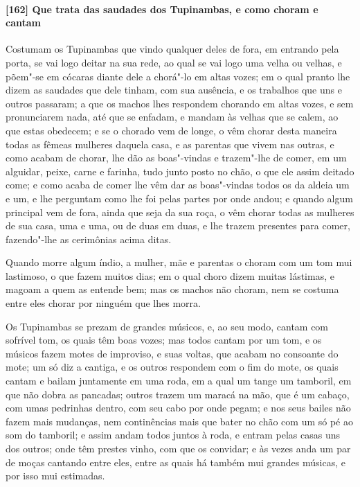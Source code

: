 \paragraph{[162] Que trata das saudades dos Tupinambas, e como choram e cantam}\quad
Costumam os Tupinambas que vindo qualquer deles de fora, em entrando pela porta, se vai
logo deitar na sua rede, ao qual se vai logo uma velha ou velhas, e põem"-se em cócaras
diante dele a chorá"-lo em altas vozes; em o qual pranto lhe dizem as saudades que dele
tinham, com sua ausência, e os trabalhos que uns e outros passaram; a que os machos lhes
respondem chorando em altas vozes, e sem pronunciarem nada, até que se enfadam, e mandam
às velhas que se calem, ao que estas obedecem; e se o chorado vem de longe, o vêm chorar
desta maneira todas as fêmeas mulheres daquela casa, e as parentas que vivem nas outras, e
como acabam de chorar, lhe dão as boas"-vindas e trazem"-lhe de comer, em um alguidar,
peixe, carne e farinha, tudo junto posto no chão, o que ele assim deitado come; e como
acaba de comer lhe vêm dar as boas"-vindas todos os da aldeia um e um, e lhe perguntam como
lhe foi pelas partes por onde andou; e quando algum principal vem de fora, ainda que seja
da sua roça, o vêm chorar todas as mulheres de sua casa, uma e uma, ou de duas em duas, e
lhe trazem presentes para comer, fazendo"-lhe as cerimônias acima ditas.

Quando morre algum índio, a mulher, mãe e parentas o choram com um tom mui lastimoso, o
que fazem muitos dias; em o qual choro dizem muitas lástimas, e magoam a quem as entende
bem; mas os machos não choram, nem se costuma entre eles chorar por ninguém que lhes
morra.

Os Tupinambas se prezam de grandes músicos, e, ao seu modo, cantam com sofrível tom, os
quais têm boas vozes; mas todos cantam por um tom, e os músicos fazem motes de improviso,
e suas voltas, que acabam no consoante do mote; um só diz a cantiga, e os outros respondem
com o fim do mote, os quais cantam e bailam juntamente em uma roda, em a qual um tange um
tamboril, em que não dobra as pancadas; outros trazem um maracá na mão, que é um cabaço,
com umas pedrinhas dentro, com seu cabo por onde pegam; e nos seus bailes não fazem mais
mudanças, nem continências mais que bater no chão com um só pé ao som do tamboril; e assim
andam todos juntos à roda, e entram pelas casas uns dos outros; onde têm prestes vinho,
com que os convidar; e às vezes anda um par de moças cantando entre eles, entre as quais
há também mui grandes músicas, e por isso mui estimadas.

